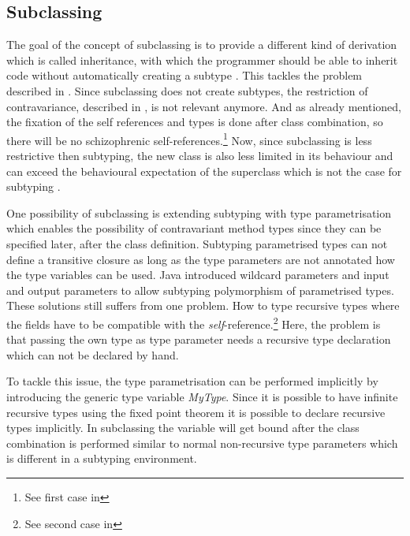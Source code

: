 \subsection{Subclassing}

The goal of the concept of subclassing is to provide a different
kind of derivation which is called inheritance, with which the
programmer should be able to inherit code without automatically creating a
subtype \cite{simons_theory_2002-2}. This tackles the problem described in
. Since subclassing does not create subtypes, the
restriction of contravariance, described in ,
is not relevant anymore. And as already mentioned, the fixation of
the self references and types is done after class combination, so there
will be no schizophrenic self-references.\footnote{See first case in
} Now, since subclassing is less restrictive
then subtyping, the new class is also less limited in its behaviour and
can exceed the behavioural expectation of the superclass which is not
the case for subtyping \cite{simons_theory_2002-2}.

One possibility of subclassing is extending subtyping with type
parametrisation which enables the possibility of contravariant
method types since they can be specified later, after the class
definition. Subtyping parametrised types can not define a transitive
closure as long as the type parameters are not annotated how the
type variables can be used. Java introduced wildcard parameters and
\cs input and output parameters to allow subtyping polymorphism
of parametrised types. These solutions still suffers from one
problem. How to type recursive types where the fields have to be
compatible with the \emph{self}-reference.\footnote{See second case in
} Here, the problem is that passing the own
type as type parameter needs a recursive type declaration which can not
be declared by hand.

To tackle this issue, the type parametrisation can be performed implicitly
by introducing the generic type variable \emph{MyType}. Since it is
possible to have infinite recursive types using the fixed point theorem
\cite{pierce_types_2002} it is possible to declare recursive types
implicitly. In subclassing the \mytype variable will get bound after the
class combination is performed similar to normal non-recursive type
parameters which is different in a subtyping environment.

